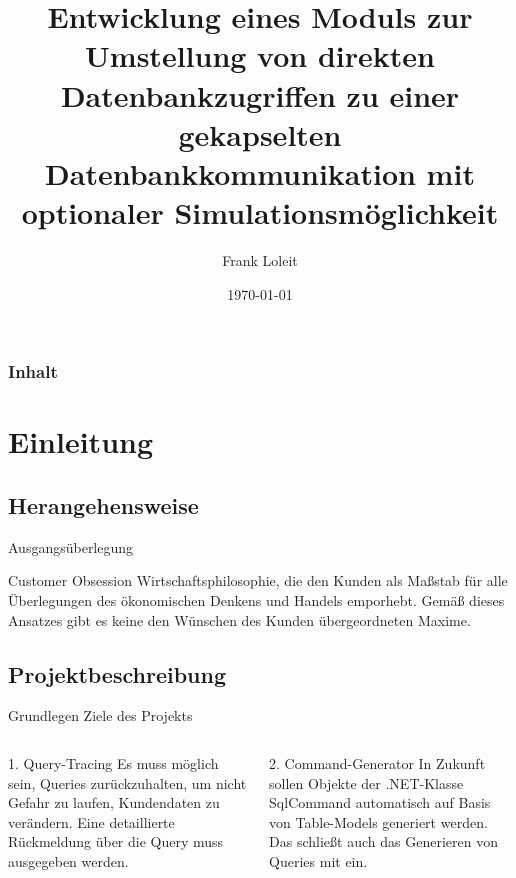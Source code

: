 \documentclass[toc]{beamer}
\title{Entwicklung eines Moduls zur Umstellung von direkten Datenbankzugriffen zu einer gekapselten Datenbankkommunikation mit optionaler Simulationsmöglichkeit}
\author{Frank Loleit}
\institute{Fachinformatiker (Anwendungsentwicklung)}
\date{\today}
\begin{document}
\begin{frame}
\titlepage
\end{frame}

\begin{frame}
    \begin{multicols}{2}
        \frametitle{Inhalt}
        \tableofcontents
    \end{multicols}
\end{frame}

\section{Einleitung}
    \subsection{Herangehensweise}
        \begin{frame}{Ausgangsüberlegung}
            \begin{block}{Customer Obsession}
                    Wirtschaftsphilosophie, die den Kunden als Maßstab für alle Überlegungen
                    des ökonomischen Denkens und Handels emporhebt. Gemäß dieses Ansatzes gibt es keine den Wünschen des Kunden übergeordneten Maxime.
            \end{block}
        \end{frame}
        
    \subsection{Projektbeschreibung}
        \begin{frame}{Grundlegen Ziele des Projekts}
                \begin{columns}
                        \begin{block}{1. Query-Tracing}
                            Es muss möglich sein, Queries zurückzuhalten, um nicht Gefahr zu laufen, Kundendaten zu verändern. Eine detaillierte Rückmeldung über die Query muss ausgegeben werden.
                        \end{block}
                        \begin{block}{2. Command-Generator}
                            In Zukunft sollen Objekte der .NET-Klasse \glqq SqlCommand\grqq{} automatisch auf Basis von Table-Models generiert werden. Das schließt auch das Generieren von Queries mit ein.
                        \end{block}
                \end{columns}
        \end{frame}
\end{document}
